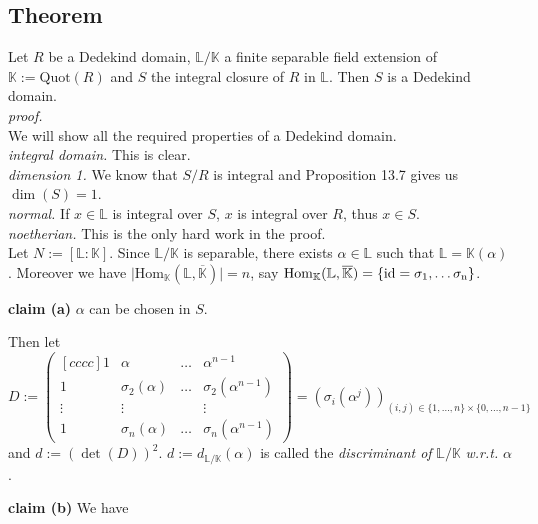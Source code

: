 \documentclass[12pt]{book}
\begin{document}
\begin{spacing}{1.3}
\begin{compactenum}
\end{compactenum}

\subsection{Theorem} %
Let $R$ be a Dedekind domain, $\mathbb{L}/\mathbb{K}$ a finite separable field extension of $\mathbb{K}:= \textrm{Quot}(R)$ and $S$ the integral closure of $R$ in $\mathbb{L}$. Then $S$ is a Dedekind domain.\\
\textit{proof.}\\
We will show all the required properties of a Dedekind domain.\\
\textit{integral domain.} This is clear.\\
\textit{dimension 1.} We know that $S/R$ is integral and Proposition 13.7 gives us $\dim(S)=1$. \\
\textit{normal.} If $x \in \mathbb{L}$ is integral over $S$, $x$ is integral over $R$, thus $x \in S$. \\
\textit{noetherian.} This is the only hard work in the proof. \\
Let $N:=[\mathbb{L}:\mathbb{K}]$. Since $\mathbb{L}/\mathbb{K}$ is separable, there exists $\alpha \in \mathbb{L}$ such that $\mathbb{L}=\mathbb{K}(\alpha)$. Moreover we have $\big\vert \textrm{Hom}_{\mathbb{K}}(\mathbb{L}, \overline{\mathbb{K}}) \big\vert =n$, say $\textrm{Hom}_{\mathbb{K}}(\mathbb{L}, \overline{\mathbb{K}})= \{\rm{id}=\sigma_1, \ldots \sigma_n \}$.
\begin{compactenum}
\item[\textbf{claim (a)}] $\alpha$ can be chosen in $S$. 
\end{compactenum}
Then let
$$D:= \begin{pmatrix}[cccc] 1 & \alpha & \ldots & \alpha^{n-1} \\ 1 & \sigma_2(\alpha) & \ldots & \sigma_2(\alpha^{n-1}) \\ \vdots & \vdots & & \vdots \\ 1 & \sigma_n(\alpha) & \ldots & \sigma_n(\alpha^{n-1}) \end{pmatrix}=\left(\sigma_i(\alpha^j)\right)_{(i,j) \in \{1, \ldots, n \} \times \{0, \ldots, n-1 \}}$$
and $d:= \left(\det(D)\right)^2$. $d:= d_{\mathbb{L}/\mathbb{K}}(\alpha)$ is called the \textit{discriminant of }$\mathbb{L}/\mathbb{K}$\textit{ w.r.t.} $\alpha$. 
\begin{compactenum}
\item[\textbf{claim (b)}]We have
 \begin{compactenum}

\end{compactenum}
\end{compactenum}
\end{spacing}
\end{document}
